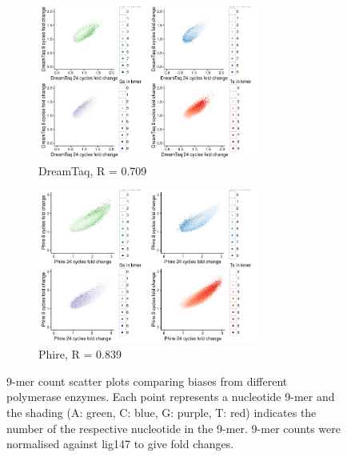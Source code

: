 \documentclass[a4paper, numbers=noenddot]{scrbook}
\begin{document}
\begin{figure}[htbp]
  \centering
  \begin{subfigure}[htbp]{0.8\textwidth}
    \centering
    \includegraphics[width=0.8\textwidth]{kmer_dreamtaq}
    \caption{DreamTaq, R = 0.709}
    \label{fig:kmer_enz_dreamtaq}
  \end{subfigure}
  \begin{subfigure}[htbp]{0.8\textwidth}
    \centering
    \includegraphics[width=0.8\textwidth]{kmer_phire}
    \caption{Phire, R = 0.839}
    \label{fig:kmer_enz_phire}
  \end{subfigure}
  \caption{9-mer count scatter plots comparing biases from different polymerase enzymes.  Each point represents a nucleotide 9-mer and the shading (A: green, C: blue, G: purple, T: red) indicates the number of the respective nucleotide in the 9-mer.  9-mer counts were normalised against lig147 to give fold changes.}
  \label{fig:kmer_enz}
\end{figure}
\end{document}

